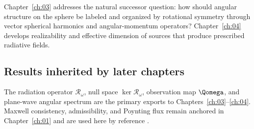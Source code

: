 Chapter~\ref{ch:03} addresses the natural successor question: how should angular structure on the sphere be labeled and organized by rotational symmetry through vector spherical harmonics and angular-momentum operators? Chapter~\ref{ch:04} develops realizability and effective dimension of sources that produce prescribed radiative fields.

\subsection{Results inherited by later chapters}
\label{sec:ch02.12.1}

The radiation operator $\mathcal{R}_\omega$, null space $\ker\mathcal{R}_\omega$, observation map $\Qomega$, and plane-wave angular spectrum are the primary exports to Chapters~\ref{ch:03}--\ref{ch:04}. Maxwell consistency, admissibility, and Poynting flux remain anchored in Chapter~\ref{ch:01} and are used here by reference \cite{maxwell1873,stratton1941}.

